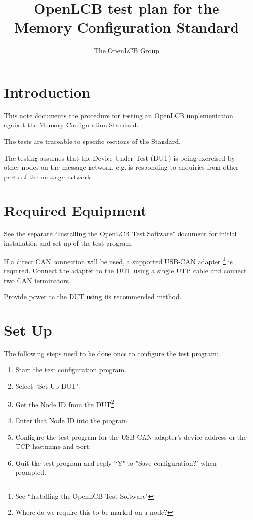 \documentclass[11pt]{article}
\title{OpenLCB test plan for the Memory Configuration Standard}
\author{The OpenLCB Group}
\begin{document}
\maketitle


\section{Introduction}

This note documents the procedure for testing an OpenLCB implementation against the
\href{https://nbviewer.org/github/openlcb/documents/blob/master/standards/MemoryConfigurationS.pdf}
    {Memory Configuration Standard}.

The tests are traceable to specific sections of the Standard.

The testing assumes that the Device Under Test (DUT) is being exercised by other
nodes on the message network, 
e.g. is responding to enquiries from other parts of the message network.

\section{Required Equipment}

See the separate ``Installing the OpenLCB Test Software" document for initial installation 
and set up of the test program.

If a direct CAN connection will be used,
a supported USB-CAN adapter
    \footnote{See ``Installing the OpenLCB Test Software"}
is required. 
Connect the adapter to the DUT using a single UTP cable and connect two CAN terminators.

Provide power to the DUT using its recommended method.

\section{Set Up}
The following steps need to be done once to configure the test program:.
\begin{enumerate}
\item Start the test configuration program. 
\item Select ``Set Up DUT".
\item Get the Node ID from the DUT\footnote{Where do we require this to be marked on a node?} 
\item Enter that Node ID into the program.
\item Configure the test program for the USB-CAN adapter's device address
        or the TCP hostname and port.
\item Quit the test program and reply ``Y" to "Save configuration?" when prompted.
\end{enumerate}
\end{document}
